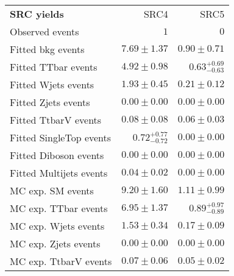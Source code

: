 

\begin{table}
\begin{center}
\setlength{\tabcolsep}{0.0pc}
{\small
\begin{tabular*}{\textwidth}{@{\extracolsep{\fill}}lrr}
\noalign{\smallskip}\hline\noalign{\smallskip}
{\bf SRC yields}           & SRC4            & SRC5              \\[-0.05cm]
\noalign{\smallskip}\hline\noalign{\smallskip}
Observed events          & $1$              & $0$                    \\
\noalign{\smallskip}\hline\noalign{\smallskip}
Fitted bkg events         & $7.69 \pm 1.37$          & $0.90 \pm 0.71$              \\
\noalign{\smallskip}\hline\noalign{\smallskip}
        Fitted TTbar events         & $4.92 \pm 0.98$          & $0.63_{-0.63}^{+0.69}$              \\
        Fitted Wjets events         & $1.93 \pm 0.45$          & $0.21 \pm 0.12$              \\
        Fitted Zjets events         & $0.00 \pm 0.00$          & $0.00 \pm 0.00$              \\
        Fitted TtbarV events         & $0.08 \pm 0.08$          & $0.06 \pm 0.03$              \\
        Fitted SingleTop events         & $0.72_{-0.72}^{+0.77}$          & $0.00 \pm 0.00$              \\
        Fitted Diboson events         & $0.00 \pm 0.00$          & $0.00 \pm 0.00$              \\
        Fitted Multijets events         & $0.04 \pm 0.02$          & $0.00 \pm 0.00$              \\
 \noalign{\smallskip}\hline\noalign{\smallskip}
MC exp. SM events              & $9.20 \pm 1.60$          & $1.11 \pm 0.99$              \\
\noalign{\smallskip}\hline\noalign{\smallskip}
        MC exp. TTbar events         & $6.95 \pm 1.37$          & $0.89_{-0.89}^{+0.97}$              \\
        MC exp. Wjets events         & $1.53 \pm 0.34$          & $0.17 \pm 0.09$              \\
        MC exp. Zjets events         & $0.00 \pm 0.00$          & $0.00 \pm 0.00$              \\
        MC exp. TtbarV events         & $0.07 \pm 0.06$          & $0.05 \pm 0.02$              \\

\end{tabular*}}
\end{center}
\end{table}
